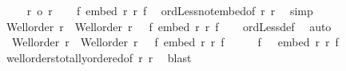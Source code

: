 \begin{isabellebody}
%
\isadelimproof
%
\endisadelimproof
%
\isatagproof
{}\isamarkupfalse%
\isanewline
\ \ \isamarkupfalse%
\ {\isacharasterisk}{\kern0pt}{\isacharcolon}{\kern0pt}\ {\isachardoublequoteopen}r\ {\isacharless}{\kern0pt}o\ r{\isacharprime}{\kern0pt}{\isachardoublequoteclose}\isanewline
\ \ \isamarkupfalse%
\ {\isachardoublequoteopen}{\isasymnot}{\isacharparenleft}{\kern0pt}{\isasymexists}f{\isacharprime}{\kern0pt}{\isachardot}{\kern0pt}\ embed\ r{\isacharprime}{\kern0pt}\ r\ f{\isacharprime}{\kern0pt}{\isacharparenright}{\kern0pt}{\isachardoublequoteclose}\ \isamarkupfalse%
\ ordLess{\isacharunderscore}{\kern0pt}not{\isacharunderscore}{\kern0pt}embed{\isacharbrackleft}{\kern0pt}of\ r\ r{\isacharprime}{\kern0pt}{\isacharbrackright}{\kern0pt}\ \isamarkupfalse%
\ simp\isanewline
\ \ \isamarkupfalse%
\ {\isacharasterisk}{\kern0pt}\ \isamarkupfalse%
\ {\isachardoublequoteopen}Well{\isacharunderscore}{\kern0pt}order\ r\ {\isasymand}\ Well{\isacharunderscore}{\kern0pt}order\ r{\isacharprime}{\kern0pt}\ {\isasymand}\ {\isasymnot}\ {\isacharparenleft}{\kern0pt}{\isasymexists}f{\isacharprime}{\kern0pt}{\isachardot}{\kern0pt}\ embed\ r{\isacharprime}{\kern0pt}\ r\ f{\isacharprime}{\kern0pt}{\isacharparenright}{\kern0pt}{\isachardoublequoteclose}\isanewline
\ \ \isamarkupfalse%
\ ordLess{\isacharunderscore}{\kern0pt}def\ \isamarkupfalse%
\ auto\isanewline
{}\isamarkupfalse%
\isanewline
\ \ \isamarkupfalse%
\ {\isacharasterisk}{\kern0pt}{\isacharcolon}{\kern0pt}\ {\isachardoublequoteopen}Well{\isacharunderscore}{\kern0pt}order\ r\ {\isasymand}\ Well{\isacharunderscore}{\kern0pt}order\ r{\isacharprime}{\kern0pt}\ {\isasymand}\ {\isasymnot}\ {\isacharparenleft}{\kern0pt}{\isasymexists}f{\isacharprime}{\kern0pt}{\isachardot}{\kern0pt}\ embed\ r{\isacharprime}{\kern0pt}\ r\ f{\isacharprime}{\kern0pt}{\isacharparenright}{\kern0pt}{\isachardoublequoteclose}\isanewline
\ \ \isamarkupfalse%
\ \isamarkupfalse%
\ f\ \ {}{\isacharcolon}{\kern0pt}\ {\isachardoublequoteopen}embed\ r\ r{\isacharprime}{\kern0pt}\ f{\isachardoublequoteclose}\isanewline
\ \ \isamarkupfalse%
\ wellorders{\isacharunderscore}{\kern0pt}totally{\isacharunderscore}{\kern0pt}ordered{\isacharbrackleft}{\kern0pt}of\ r\ r{\isacharprime}{\kern0pt}{\isacharbrackright}{\kern0pt}\ \isamarkupfalse%
\ blast\isanewline
\ \ \isamarkupfalse%

\end{isabellebody}
